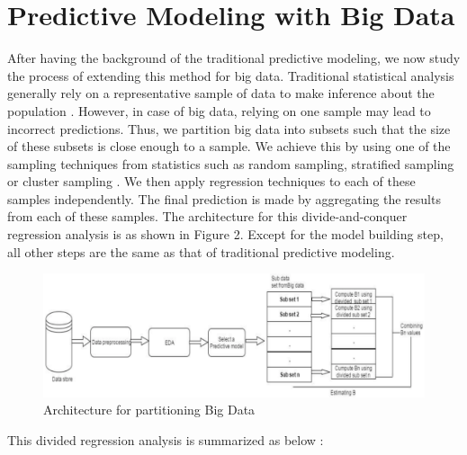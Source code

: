 \documentclass[sigconf]{acmart}
\begin{document}
\section{Predictive Modeling with Big Data}

After having the background of the traditional predictive modeling, we now study the process of extending this method for big data. Traditional statistical analysis generally rely on a representative sample of data to make inference about the population \cite{part-reg}. However, in case of big data, relying on one sample may lead to incorrect predictions. Thus, we partition big data into subsets such that the size of these subsets is close enough to a sample. We achieve this by using one of the sampling techniques from statistics such as random sampling, stratified sampling or cluster sampling \cite{div-reg}. We then apply regression techniques to each of these samples independently. The final prediction is made by aggregating the results from each of these samples. The architecture for this divide-and-conquer regression analysis is as shown in Figure 2. Except for the model building step, all other steps are the same as that of traditional predictive modeling.

\begin{figure}[!ht]
  \centering\includegraphics[width=\columnwidth]{images/Fig2.png}
  \caption{Architecture for partitioning Big Data \cite{part-reg}}
  \label{Figure 2}
\end{figure}

This divided regression analysis is summarized as below \cite{div-reg}:
\end{document}
